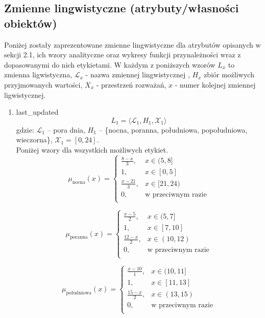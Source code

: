 \documentclass{article}
\begin{document}
\subsection{Zmienne lingwistyczne (atrybuty/własności obiektów)}
Poniżej zostały zaprezentowane zmienne lingwistyczne dla atrybutów opisanych w sekcji 2.1, ich wzory analityczne oraz wykresy funkcji przynależności wraz z dopasowanymi do nich etykietami. W każdym z poniższych wzorów \(L_x\) to zmienna ligwistyczna, $\mathcal{L}_x$ - nazwa zmiennej lingwistycznej , \(H_x\) zbiór możliwych przyjmowanych wartości, \(X_x\) - przestrzeń rozważań, \(x\) - numer kolejnej zmiennej ligwistycznej. 
\begin{enumerate}
    \item last\_updated
        \begin{equation}
            L_1 = \langle \mathcal{L}_1, H_1, \mathcal{X}_1 \rangle
        \end{equation}
        gdzie: $\mathcal{L}_1$ – pora dnia, $H_1$ – \{nocna, poranna, południowa, popołudniowa, wieczorna\}, $\mathcal{X}_1 = [0, 24]$. \\
        Poniżej wzory dla wszystkich możliwych etykiet.
        \begin{equation}
            \mu_{\text{nocna}}(x) =
            \begin{cases}
            \frac{8 - x}{3}, & x \in (5, 8] \\
            1, & x \in [0, 5] \\
            \frac{x - 21}{3}, & x \in [21, 24) \\
            0, & \text{w przeciwnym razie} \\
            \end{cases}
        \end{equation}

        \begin{equation}
            \mu_{\text{poranna}}(x) =
            \begin{cases}
            \frac{x - 5}{2}, & x \in (5, 7] \\
            1, & x \in [7, 10] \\
            \frac{12 - x}{2}, & x \in (10, 12) \\
            0, & \text{w przeciwnym razie} \\
            \end{cases}
        \end{equation}

        \begin{equation}
            \mu_{\text{południowa}}(x) =
            \begin{cases}
            \frac{x - 10}{1}, & x \in (10, 11] \\
            1, & x \in [11, 13] \\
            \frac{15 - x}{2}, & x \in (13, 15) \\
            0, & \text{w przeciwnym razie} \\
            \end{cases}
        \end{equation}


\end{enumerate}
\end{document}
